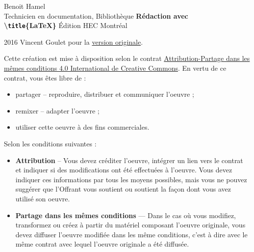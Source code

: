 \small


\begin{frame}
	
	\tiny
	Benoit Hamel \\
	Technicien en documentation, Bibliothèque
	\vfill
	{\Huge\bfseries Rédaction avec \\
	\textbackslash \texttt{title}\{\textrm{\LaTeX}\}}
	\vfill
	Édition HEC Montréal
	
\end{frame}


\begin{frame}
	
	\tiny
	{\faCopyright} 2016 Vincent Goulet pour la
	\href{https://ctan.org/pkg/formation-latex-ul}{version originale}.
	
	{\faCreativeCommons} Cette création est mise à disposition selon le contrat
	\href{http://creativecommons.org/licenses/by-sa/4.0/deed.fr}%
	{Attribution-Partage dans les mêmes conditions 4.0 International de Creative Commons}.
	En vertu de ce contrat, vous êtes libre de :
	
	\begin{itemize}
		\item partager -- reproduire, distribuer et communiquer l’oeuvre ;
		\item remixer -- adapter l’oeuvre ;
		\item utiliser cette oeuvre à des fins commerciales.
	\end{itemize}

	Selon les conditions suivantes :
	
	\begin{itemize}
		
		\item \textbf{Attribution} -- Vous devez créditer l’oeuvre, intégrer un lien vers le contrat et indiquer si des modifications ont été effectuées	à l’oeuvre. Vous devez indiquer ces informations par tous les moyens possibles, mais vous ne pouvez suggérer que l’Offrant vous soutient ou soutient la façon dont vous avez utilisé son oeuvre.
		
		\item \textbf{Partage dans les mêmes conditions} — Dans le cas où vous modifiez, transformez ou créez à partir du matériel composant l’oeuvre originale, vous devez diffuser l’oeuvre modifiée dans les même conditions, c’est à dire avec le même contrat avec	lequel l’oeuvre originale a été diffusée.
		
	\end{itemize}

\end{frame}

